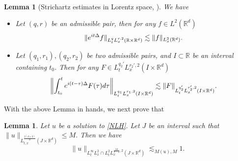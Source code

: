 \documentclass[reqno,11pt]{amsart}
\theoremstyle{plain}
\newtheorem{lemma}[theorem]{Lemma}
\theoremstyle{definition}
\numberwithin{equation}{section}
\numberwithin{theorem}{section}
\def\leq{\leqslant}
\def\R{\mathbb{R}}
\begin{document}
\begin{lemma}[Strichartz estimates in Lorentz space, \cite{KT}]\label{P:SZ} We have
\begin{itemize}
\item[$(i)$] Let $(q,r)$ be an admissible pair, then for any $f\in L^2(\mathbb{R}^d)$
\begin{align}  
\|e^{it\Delta }f\|_{L^q_t L^{r,2}_x(\mathbb{R}\times \mathbb{R}^d)} \lesssim \|f\|_{L^2_x(\mathbb{R}^d)}.\notag
\end{align}
		
\item[$(ii)$] Let $(q_1, r_1), (q_2,r_2)$ be two admissible pairs,  and $I\subset \mathbb{R}$ be an interval containing $t_0$. Then for any $F\in L_t^{q_2'}L^{r_2',2}_x(I\times \mathbb{R}^d)$ 
\begin{align} 
\left\|\int_{t_0}^t e^{i(t-\tau)\Delta } F(\tau) d\tau\right\|_{L^{q_1}_tL^{r_1,2}_x(I\times \mathbb{R}^d)} \lesssim \|F\|_{L^{q_2'}_tL^{r_2',2}_x(I\times \mathbb{R}^d)}.\notag
\end{align}
\end{itemize}
\end{lemma}

With the above Lemma in hands, we next prove that 
\begin{lemma}\label{lorennorm}
Let $u$ be a solution to \eqref{NLH}. Let $J$ be an interval such that $\|u\|_{L_{t,x}^{\frac{2(d+2)}{d}}(J\times\R^d)}\leq M$. Then we have
\begin{equation}\label{lorennormes}
\|u\|_{L_t^{\infty}L_x^2\cap L_t^2L_x^{\frac{2d}{d-2},2}(J\times\R^d)}\lesssim_{M(u),M} 1.
\end{equation}
\end{lemma}
\end{document}

